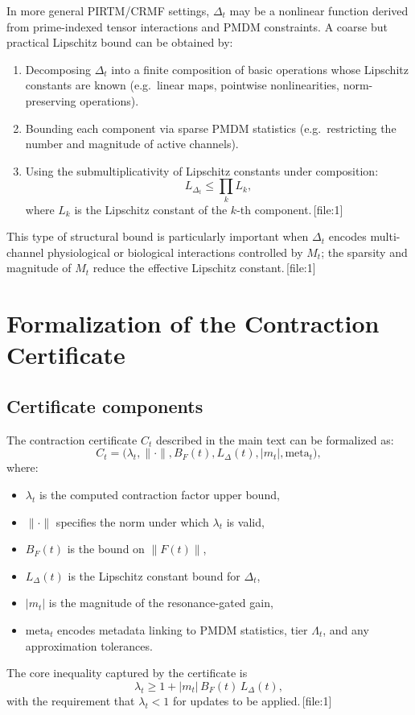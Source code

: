 \documentclass[11pt]{article}
\begin{document}
In more general PIRTM/CRMF settings, $\Delta_t$ may be a nonlinear function derived from prime-indexed tensor interactions and PMDM constraints.
A coarse but practical Lipschitz bound can be obtained by:
\begin{enumerate}
  \item Decomposing $\Delta_t$ into a finite composition of basic operations whose Lipschitz constants are known (e.g.\ linear maps, pointwise nonlinearities, norm-preserving operations).
  \item Bounding each component via sparse PMDM statistics (e.g.\ restricting the number and magnitude of active channels).
  \item Using the submultiplicativity of Lipschitz constants under composition:
  \[
    L_{\Delta_t} \le \prod_{k} L_k,
  \]
  where $L_k$ is the Lipschitz constant of the $k$-th component.\,[file:1]
\end{enumerate}
This type of structural bound is particularly important when $\Delta_t$ encodes multi-channel physiological or biological interactions controlled by $M_t$; the sparsity and magnitude of $M_t$ reduce the effective Lipschitz constant.\,[file:1]

\section{Formalization of the Contraction Certificate}

\subsection{Certificate components}

The contraction certificate $C_t$ described in the main text can be formalized as:
\[
  C_t = \bigl(\lambda_t, \|\cdot\|, B_F(t), L_\Delta(t), |m_t|,\text{meta}_t\bigr),
\]
where:
\begin{itemize}
  \item $\lambda_t$ is the computed contraction factor upper bound,
  \item $\|\cdot\|$ specifies the norm under which $\lambda_t$ is valid,
  \item $B_F(t)$ is the bound on $\|F(t)\|$,
  \item $L_\Delta(t)$ is the Lipschitz constant bound for $\Delta_t$,
  \item $|m_t|$ is the magnitude of the resonance-gated gain,
  \item $\text{meta}_t$ encodes metadata linking to PMDM statistics, tier $\Lambda_t$, and any approximation tolerances.
\end{itemize}
The core inequality captured by the certificate is
\[
  \lambda_t \ge 1 + |m_t|\,B_F(t)\,L_\Delta(t),
\]
with the requirement that $\lambda_t<1$ for updates to be applied.\,[file:1]
\end{document}
